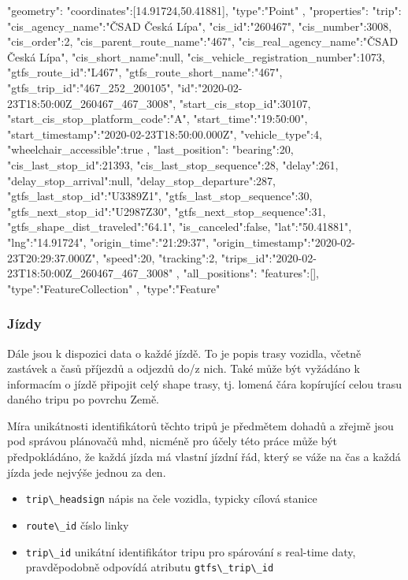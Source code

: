 \begin{code}[frame=none]
"geometry":{
  "coordinates":[14.91724,50.41881],
  "type":"Point"
},
"properties":{
  "trip":{
    "cis_agency_name":"ČSAD Česká Lípa",
	"cis_id":"260467",
	"cis_number":3008,
	"cis_order":2,
	"cis_parent_route_name":"467",
	"cis_real_agency_name":"ČSAD Česká Lípa",
	"cis_short_name":null,
	"cis_vehicle_registration_number":1073,
	"gtfs_route_id":"L467",
	"gtfs_route_short_name":"467",
	"gtfs_trip_id":"467_252_200105",
	"id":"2020-02-23T18:50:00Z_260467_467_3008",
	"start_cis_stop_id":30107,
	"start_cis_stop_platform_code":"A",
	"start_time":"19:50:00",
	"start_timestamp":"2020-02-23T18:50:00.000Z",
	"vehicle_type":4,
	"wheelchair_accessible":true
  },
  "last_position":{
    "bearing":20,
	"cis_last_stop_id":21393,
	"cis_last_stop_sequence":28,
	"delay":261,
	"delay_stop_arrival":null,
	"delay_stop_departure":287,
	"gtfs_last_stop_id":"U3389Z1",
	"gtfs_last_stop_sequence":30,
	"gtfs_next_stop_id":"U2987Z30",
	"gtfs_next_stop_sequence":31,
	"gtfs_shape_dist_traveled":"64.1",
	"is_canceled":false,
	"lat":"50.41881",
	"lng":"14.91724",
	"origin_time":"21:29:37",
	"origin_timestamp":"2020-02-23T20:29:37.000Z",
	"speed":20,
	"tracking":2,
	"trips_id":"2020-02-23T18:50:00Z_260467_467_3008"
	},
  "all_positions":{
    "features":[],
	"type":"FeatureCollection"
  }
},
"type":"Feature"

\end{code}

\subsubsection{Jízdy}

Dále jsou k dispozici data o každé jízdě. To je popis trasy vozidla, včetně zastávek a časů příjezdů a odjezdů do/z nich. Také může být vyžádáno k informacím o jízdě připojit celý shape trasy, tj. lomená čára kopírující celou trasu daného tripu po povrchu Země.

\bigbreak

 Míra unikátnosti identifikátorů těchto tripů je předmětem dohadů a zřejmě jsou pod správou plánovačů \gls{mhd}, nicméně pro účely této práce může být předpokládáno, že každá jízda má vlastní jízdní řád, který se váže na čas a každá jízda jede nejvýše jednou za den.

\begin{itemize}
	\item \verb-trip\_headsign- nápis na čele vozidla, typicky cílová stanice

	\item \verb-route\_id- číslo linky

	\item \verb-trip\_id- unikátní identifikátor tripu pro spárování s real-time daty, pravděpodobně odpovídá atributu \verb"gtfs\_trip\_id"


\end{itemize}

